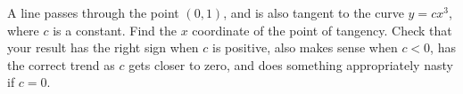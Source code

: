 A line passes through the point $(0,1)$, and is also tangent to the
curve $y=cx^3$, where $c$ is a constant. Find the $x$ coordinate of
the point of tangency. Check that your result has the right sign when
$c$ is positive, also makes sense when $c<0$,
has the correct trend as $c$ gets closer to zero, and does something appropriately
nasty if $c=0$.
\answercheck

